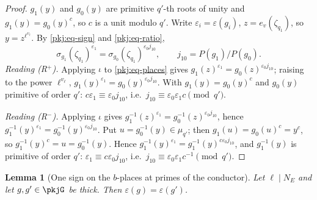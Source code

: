 \documentclass[10pt]{amsart}
\newtheorem{lemma}[theorem]{Lemma}
\theoremstyle{definition}
\theoremstyle{remark}
\begin{document}
\begin{proof}
$g_1(y)$ and $g_0(y)$ are primitive $q'$-th roots of unity and $g_1(y)=g_0(y)^c$, so $c$ is a unit
modulo $q'$. Write $\varepsilon_i=\varepsilon(g_i)$, $z=e_v(\zeta_{q_1})$, so $y=z^{\ell^{v_\ell}}$. By
\eqref{pkj:eq-sign} and \eqref{pkj:eq-ratio},
\begin{equation}\label{pkj:eq-places}
\sigma_{g_1}(\zeta_{q_1})^{\varepsilon_1}=\sigma_{g_0}(\zeta_{q_1})^{\varepsilon_0j_{10}},\qquad
j_{10}=P(g_1)/P(g_0).
\end{equation}
\emph{Reading (R$^+$).} Applying $\iota$ to \eqref{pkj:eq-places} gives $g_1(z)^{\varepsilon_1}=
g_0(z)^{\varepsilon_0j_{10}}$; raising to the power $\ell^{v_\ell}$, $g_1(y)^{\varepsilon_1}=g_0(y)^{\varepsilon_0j_{10}}$.
With $g_1(y)=g_0(y)^c$ and $g_0(y)$ primitive of order $q'$: $c\varepsilon_1\equiv\varepsilon_0j_{10}$, i.e.\
$j_{10}\equiv\varepsilon_0\varepsilon_1c\pmod{q'}$.

\emph{Reading (R$^-$).} Applying $\iota$ gives $g_1^{-1}(z)^{\varepsilon_1}=g_0^{-1}(z)^{\varepsilon_0j_{10}}$,
hence $g_1^{-1}(y)^{\varepsilon_1}=g_0^{-1}(y)^{\varepsilon_0j_{10}}$. Put $u=g_0^{-1}(y)\in\mu_{q'}$; then
$g_1(u)=g_0(u)^c=y^c$, so $g_1^{-1}(y)^c=u=g_0^{-1}(y)$. Hence $g_1^{-1}(y)^{\varepsilon_1}=
g_1^{-1}(y)^{c\varepsilon_0j_{10}}$, and $g_1^{-1}(y)$ is primitive of order $q'$: $\varepsilon_1\equiv
c\varepsilon_0j_{10}$, i.e.\ $j_{10}\equiv\varepsilon_0\varepsilon_1c^{-1}\pmod{q'}$.
\end{proof}

\begin{lemma}[One sign on the $b$-places at primes of the conductor]\label{pkj:signs}
Let $\ell\mid N_E$ and let $g,g'\in\pkjG$ be thick. Then $\varepsilon(g)=\varepsilon(g')$.
\end{lemma}
\end{document}
